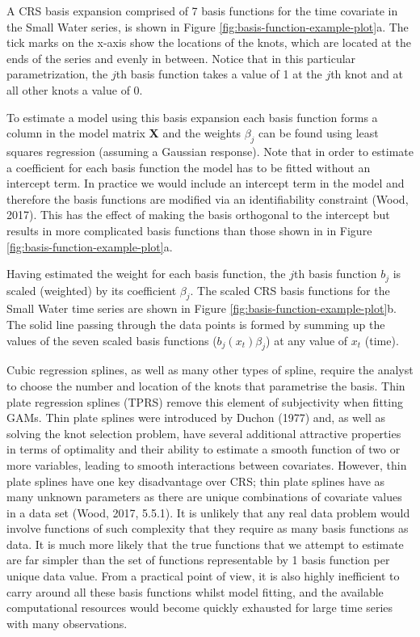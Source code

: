 \documentclass[12pt,]{article}
\begin{document}
A CRS basis expansion comprised of 7 basis functions for the time
covariate in the Small Water series, is shown in Figure
\ref{fig:basis-function-example-plot}a. The tick marks on the x-axis
show the locations of the knots, which are located at the ends of the
series and evenly in between. Notice that in this particular
parametrization, the \(j\)th basis function takes a value of 1 at the
\(j\)th knot and at all other knots a value of 0.

To estimate a model using this basis expansion each basis function forms
a column in the model matrix \textbf{X} and the weights \(\beta_j\) can
be found using least squares regression (assuming a Gaussian response).
Note that in order to estimate a coefficient for each basis function the
model has to be fitted without an intercept term. In practice we would
include an intercept term in the model and therefore the basis functions
are modified via an identifiability constraint (Wood, 2017). This has
the effect of making the basis orthogonal to the intercept but results
in more complicated basis functions than those shown in in Figure
\ref{fig:basis-function-example-plot}a.

Having estimated the weight for each basis function, the \(j\)th basis
function \(b_j\) is scaled (weighted) by its coefficient \(\beta_j\).
The scaled CRS basis functions for the Small Water time series are shown
in Figure \ref{fig:basis-function-example-plot}b. The solid line passing
through the data points is formed by summing up the values of the seven
scaled basis functions (\(b_j(x_t) \beta_j\)) at any value of \(x_t\)
(time).

Cubic regression splines, as well as many other types of spline, require
the analyst to choose the number and location of the knots that
parametrise the basis. Thin plate regression splines (TPRS) remove this
element of subjectivity when fitting GAMs. Thin plate splines were
introduced by Duchon (1977) and, as well as solving the knot selection
problem, have several additional attractive properties in terms of
optimality and their ability to estimate a smooth function of two or
more variables, leading to smooth interactions between covariates.
However, thin plate splines have one key disadvantage over CRS; thin
plate splines have as many unknown parameters as there are unique
combinations of covariate values in a data set (Wood, 2017, 5.5.1). It
is unlikely that any real data problem would involve functions of such
complexity that they require as many basis functions as data. It is much
more likely that the true functions that we attempt to estimate are far
simpler than the set of functions representable by 1 basis function per
unique data value. From a practical point of view, it is also highly
inefficient to carry around all these basis functions whilst model
fitting, and the available computational resources would become quickly
exhausted for large time series with many observations.
\end{document}
